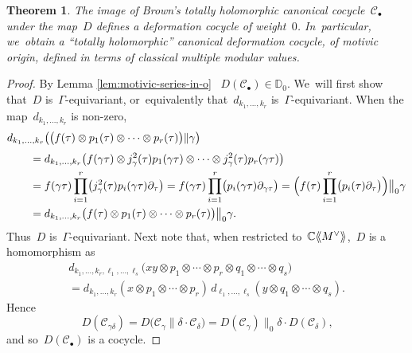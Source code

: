 \documentclass[JEP,XML,SOM,Unicode,published]{cedram}
\let\oldbullet\bullet
\renewcommand{\bullet}{{\scriptscriptstyle\oldbullet}}
\theoremstyle{plain}
\newtheorem{theorem}[theoremcounter]{Theorem}
\theoremstyle{definition}
\newcommand{\tx}{\text}
\newcommand{\nbd}{\nobreakdash-\hspace{0pt}}
\newcommand{\bbC}{\ensuremath{\mathbb{C}}}
\newcommand{\bbD}{\ensuremath{\mathbb{D}}}
\newcommand{\cC}{\ensuremath{\mathcal{C}}}
\let\Ga\Gamma
\let\ga\gamma
\newcommand{\llangle}{\mathopen{\langle\mspace{-4mu}\langle}}
\newcommand{\rrangle}{\mathclose{\rangle\mspace{-4mu}\rangle}}
\begin{document}
\begin{theorem}
\label{thm:canonical-cocycle}
The image of Brown's totally holomorphic canonical cocycle~$\cC_\bullet$ under the map~$D$ defines a deformation cocycle of weight~$0$. In~particular, we~obtain a ``totally holomorphic'' canonical deformation cocycle, of motivic origin, defined in terms of classical multiple modular values.
\end{theorem}
\begin{proof}
By Lemma \ref{lem:motivic-series-in-o} ~$D(\cC_\bullet)\in\bbD_0$. We~will first show that~$D$ is~$\Ga$\nbd{}equivariant, or~equivalently that~$d_{k_1,\ldots,k_r}$ is~$\Ga$\nbd{}equivariant. When the map~$d_{k_1,\ldots,k_r}$ is non-zero,
\begin{align*}
d_{k_1,\ldots,k_r}&\bigl(\bigl(f(\tau)\otimes p_1(\tau)\otimes\cdots \otimes p_r(\tau) \bigr)\|\ga\bigr)\\[
.2\baselineskip]
={}& d_{k_1,\ldots,k_r}\bigl(f(\ga\tau) \otimes j^2_\ga(\tau)p_1(\ga\tau)\otimes\cdots\otimes j^2_\ga(\tau) p_r(\ga\tau)\bigr)\\
={}& f(\ga\tau) \prod_{i=1}^r \bigl(j^2_\ga(\tau)p_i(\ga\tau) \partial_\tau\bigr)
= f(\ga\tau)\prod_{i=1}^r \bigl(p_i(\ga\tau)\partial_{\ga\tau}\bigr)
= \Bigl(f(\tau)\prod_{i=1}^r\bigl(p_i(\tau)\partial_\tau\bigr)\Bigr)\big\|_0 \ga\\
={}& d_{k_1,\ldots,k_r}\bigl(f(\tau)\otimes p_1(\tau)\otimes\cdots\otimes p_r(\tau)\bigr)\big\|_0 \ga
\tx{.}
\end{align*}
Thus~$D$ is~$\Ga$\nbd{}equivariant. Next note that, when restricted to~$\bbC\llangle M^\vee\rrangle$,~$D$ is a homomorphism as
\begin{multline*}
d_{k_1,\ldots,k_r,\ell_1,\ldots,\ell_s}
\bigl(xy\otimes p_1\otimes\cdots\otimes p_r\otimes q_1\otimes \cdots\otimes q_s \bigr)
\\
=
d_{k_1,\ldots,k_r}(x\otimes p_1\otimes\cdots\otimes p_r)\,
d_{\ell_1,\ldots,\ell_s}(y\otimes q_1\otimes\cdots\otimes q_s)
\tx{.}
\end{multline*}
Hence
\begin{equation*}
D(\cC_{\ga\delta})
=
D\bigl(\cC_\ga\big\|\delta\cdot\cC_\delta \bigr)
=
D(\cC_\ga)\big\|_0\delta\cdot D(\cC_\delta)
\tx{,}
\end{equation*}
and so~$D(\cC_\bullet)$ is a cocycle.
\end{proof}
\end{document}
